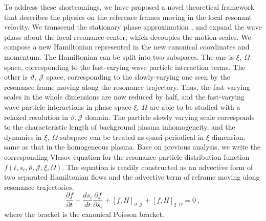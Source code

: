 To address these shortcomings, we have proposed a novel theoretical framework \cite{} that  describes the physics on the reference frames moving in the local resonant velocity.
We transcend the stationary phase approximation \cite{spa1,spa2}, and expand the wave phase about the local resonance center, which decouples the motion scales. 
We compose a new Hamiltonian  represented in the new canonical coordinates and momentum. The Hamiltonian can be split into two subspaces. The one is $\xi,~\Omega$ space, corresponding to the fast-varying wave particle interaction terms. The other is $\vartheta,~\mathcal{J}$ space, corresponding to the slowly-varying one seen by the resonance frame moving along the resonance trajectory.
Thus, the fast varying scales in the whole dimensions are now reduced by half, and the fast-varying wave particle interactions in phase space $\xi,~\Omega$ are able to be studied with a relaxed resolution in $\vartheta, \mathcal{J}$ domain.
The particle slowly varying scale corresponds to the characteristic length of background plasma inhomogeneity, and the dynamics in $\xi,~\Omega$ subspace can be treated as quasi-periodical in $\xi$ dimension, same as that in the homogeneous plasma. 
Base on previous analysis, we write the corresponding Vlasov equation for the resonance particle distribution function $f(t,s_i,\vartheta,\mathcal{J},\xi,\Omega)$. The equation is readily constructed as an advective form of two separated Hamiltonian flows and the advective term of reframe moving along resonance trajectories.
\begin{equation}\label{eq.Vlasov}
    \frac{\partial f}{\partial t}+ \frac{d s_{i}}{d t} \frac{\partial f}{\partial s_{i}} + \left[f, H\right]_{\vartheta,\mathcal{J}} +  \left[f, H\right]_{\xi,\Omega} = 0~,
\end{equation}
where the bracket is the canonical Poisson bracket.

